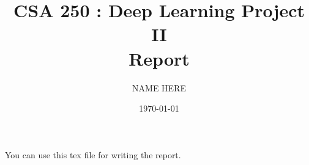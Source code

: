\documentclass[10pt,a4paper]{article}
\title{CSA 250 : Deep Learning Project II \\ Report}
\author{NAME HERE}
\date{\today}
\begin{document}
\maketitle

You can use this tex file for writing the report. 





\end{document}
